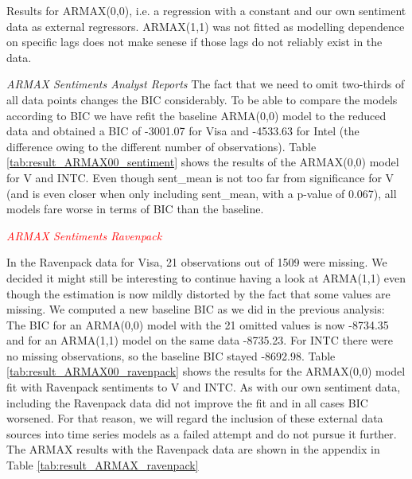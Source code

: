 \begin{table}[h!]
    \centering
    \vspace{-2ex}
    \small
    
    \vspace{1ex}
    
    \vspace{-2ex}
    \small
    
    \caption{Results for ARMAX(0,0), i.e. a regression with a constant and our own sentiment data as external regressors. ARMAX(1,1) was not fitted as modelling dependence on specific lags does not make senese if those lags do not reliably exist in the data.}
    \label{tab:result_ARMAX00_sentiment}
\end{table}{}

\textit{\textcolor{yellow}{}ARMAX Sentiments Analyst Reports}
The fact that we need to omit two-thirds of all data points changes the BIC considerably. To be able to compare the models according to BIC we have refit the baseline ARMA(0,0) model to the reduced data and obtained a BIC of -3001.07 for Visa and -4533.63 for Intel  (the difference owing to the different number of observations). Table \ref{tab:result_ARMAX00_sentiment} shows the results of the ARMAX(0,0) model for V and INTC. Even though sent\_mean is not too far from significance for V (and is even closer when only including sent\_mean, with a p-value of 0.067), all models fare worse in terms of BIC than the baseline. 

\textit{\textcolor{red}{ARMAX Sentiments Ravenpack}}

In the Ravenpack data for Visa, 21 observations out of 1509 were missing. We decided it might still be interesting to continue having a look at ARMA(1,1) even though the estimation is now mildly distorted by the fact that some values are missing. We computed a new baseline BIC as we did in the previous analysis: The BIC for an ARMA(0,0) model with the 21 omitted values is now -8734.35 and for an ARMA(1,1) model on the same data -8735.23. For INTC there were no missing observations, so the baseline BIC stayed -8692.98. Table \ref{tab:result_ARMAX00_ravenpack} shows the results for the ARMAX(0,0) model fit with Ravenpack sentiments to V and INTC. As with our own sentiment data, including the Ravenpack data did not improve the fit and in all cases BIC worsened. For that reason, we will regard the inclusion of these external data sources into time series models as a failed attempt and do not pursue it further. The ARMAX results with the Ravenpack data are shown in the appendix in Table \ref{tab:result_ARMAX_ravenpack}


